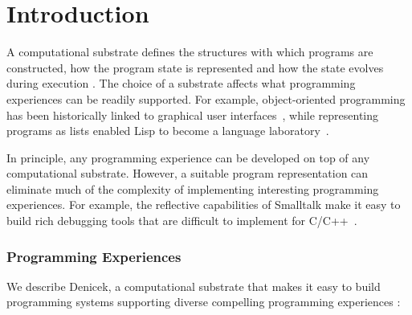 \documentclass[sigconf]{acmart}
\newcommand{\diff}[1]{{#1}}
\newcommand{\note}[1]{}
\begin{document}
\section{Introduction}

A computational\enlargethispage{12pt} substrate defines the structures with which programs are constructed, how
the program state is represented and how the state evolves during execution \cite{jakubovic-2022-ladder}.
The choice of a substrate affects what programming experiences can be readily supported.
For example, object-oriented programming has been historically linked to graphical user
interfaces~\cite{kay-1993-smalltalk}, while representing programs as lists enabled Lisp to become
a language laboratory~\cite{steele-1993-lisp}.

In principle, any programming experience can be developed on top of any computational
substrate. However, a suitable program representation can eliminate much of the complexity of implementing interesting
programming experiences. For example, the reflective capabilities of Smalltalk make it easy
to build rich debugging tools \cite{rauch-2019-babylonian} that are difficult to implement
for C/C++~\cite{kell-2018-unix,kell-2024-debugging}.

\subsubsection*{Programming Experiences}

\note{Revised to say Denicek is a substrate used to build programming systems.}
\diff{We describe Denicek, a computational substrate that makes it easy to build programming systems
supporting diverse compelling programming experiences \cite{myers-2006-eup}:}
\end{document}
